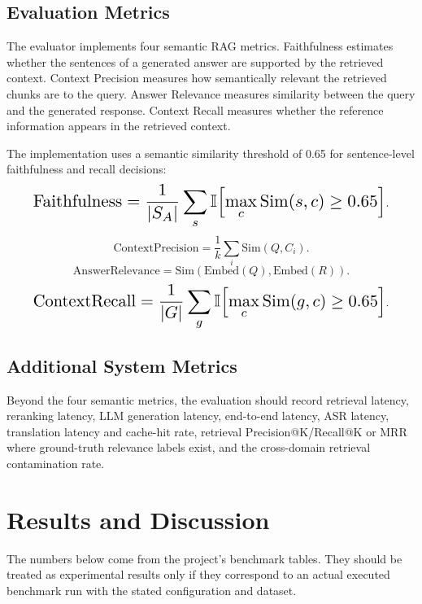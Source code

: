 \documentclass[10pt,twocolumn,letterpaper]{article}
\begin{document}
\subsection{Evaluation Metrics}
The evaluator implements four semantic RAG metrics. Faithfulness estimates whether the sentences of a generated answer are supported by the retrieved context. Context Precision measures how semantically relevant the retrieved chunks are to the query. Answer Relevance measures similarity between the query and the generated response. Context Recall measures whether the reference information appears in the retrieved context.

The implementation uses a semantic similarity threshold of 0.65 for sentence-level faithfulness and recall decisions:
\begin{equation}
\resizebox{0.9\columnwidth}{!}{$\displaystyle \mathrm{Faithfulness} = \frac{1}{|S_A|} \sum_s \mathbb{I}\!\left[ \max_c \mathrm{Sim}(s, c) \geq 0.65 \right]$}.
\end{equation}
\begin{equation}
\mathrm{ContextPrecision} = \frac{1}{k} \sum_i \mathrm{Sim}(Q, C_i).
\end{equation}
\begin{equation}
\mathrm{AnswerRelevance} = \mathrm{Sim}(\mathrm{Embed}(Q), \mathrm{Embed}(R)).
\end{equation}
\begin{equation}
\resizebox{0.9\columnwidth}{!}{$\displaystyle \mathrm{ContextRecall} = \frac{1}{|G|} \sum_g \mathbb{I}\!\left[ \max_c \mathrm{Sim}(g, c) \geq 0.65 \right]$}.
\end{equation}

\subsection{Additional System Metrics}
Beyond the four semantic metrics, the evaluation should record retrieval latency, reranking latency, LLM generation latency, end-to-end latency, ASR latency, translation latency and cache-hit rate, retrieval Precision@K/Recall@K or MRR where ground-truth relevance labels exist, and the cross-domain retrieval contamination rate.

\section{Results and Discussion}
The numbers below come from the project's benchmark tables. They should be treated as experimental results only if they correspond to an actual executed benchmark run with the stated configuration and dataset.
\end{document}

